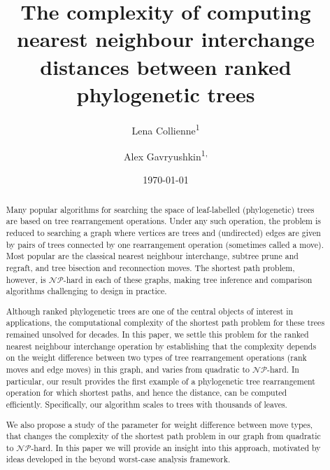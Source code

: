 \documentclass[11pt]{amsart}
\title[Computing $\rnni$ distance]{The complexity of computing nearest neighbour interchange distances between ranked phylogenetic trees}
\date{\today}
\author{Lena Collienne\textsuperscript{1}}
\author{Alex Gavryushkin\textsuperscript{1, \Letter}}
\newcommand{\np}{\mathcal{NP}}
\begin{document}
\begin{abstract}
Many popular algorithms for searching the space of leaf-labelled (phylogenetic) trees are based on tree rearrangement operations.
Under any such operation, the problem is reduced to searching a graph where vertices are trees and (undirected) edges are given by pairs of trees connected by one rearrangement operation (sometimes called a move).
Most popular are the classical nearest neighbour interchange, subtree prune and regraft, and tree bisection and reconnection moves.
The shortest path problem, however, is $\np$-hard in each of these graphs, making tree inference and comparison algorithms challenging to design in practice.

Although ranked phylogenetic trees are one of the central objects of interest in applications, the computational complexity of the shortest path problem for these trees remained unsolved for decades.
In this paper, we settle this problem for the ranked nearest neighbour interchange operation by establishing that the complexity depends on the weight difference between two types of tree rearrangement operations (rank moves and edge moves) in this graph, and varies from quadratic to $\np$-hard.
In particular, our result provides the first example of a phylogenetic tree rearrangement operation for which shortest paths, and hence the distance, can be computed efficiently.
Specifically, our algorithm scales to trees with thousands of leaves.

We also propose a study of the parameter for weight difference between move types, that changes the complexity of the shortest path problem in our graph from quadratic to $\np$-hard.
In this paper we will provide an insight into this approach, motivated by ideas developed in the beyond worst-case analysis framework.
\end{abstract}


\maketitle
\thispagestyle{empty}

\newpage

\setcounter{page}{1}
\end{document}
